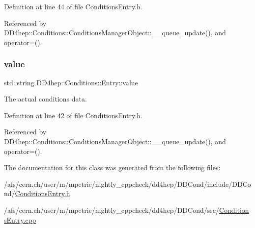 Definition at line 44 of file Conditions\+Entry.\+h.



Referenced by D\+D4hep\+::\+Conditions\+::\+Conditions\+Manager\+Object\+::\+\_\+\+\_\+queue\+\_\+update(), and operator=().

\hypertarget{class_d_d4hep_1_1_conditions_1_1_entry_a28dbb34f86ab05df22df9f9756100bcf}{}\label{class_d_d4hep_1_1_conditions_1_1_entry_a28dbb34f86ab05df22df9f9756100bcf} 
\subsubsection{\texorpdfstring{value}{value}}
{\footnotesize\ttfamily std\+::string D\+D4hep\+::\+Conditions\+::\+Entry\+::value}



The actual conditions data. 



Definition at line 42 of file Conditions\+Entry.\+h.



Referenced by D\+D4hep\+::\+Conditions\+::\+Conditions\+Manager\+Object\+::\+\_\+\+\_\+queue\+\_\+update(), and operator=().



The documentation for this class was generated from the following files\+:\begin{DoxyCompactItemize}
\item 
/afs/cern.\+ch/user/m/mpetric/nightly\+\_\+cppcheck/dd4hep/\+D\+D\+Cond/include/\+D\+D\+Cond/\hyperlink{_conditions_entry_8h}{Conditions\+Entry.\+h}\item 
/afs/cern.\+ch/user/m/mpetric/nightly\+\_\+cppcheck/dd4hep/\+D\+D\+Cond/src/\hyperlink{_conditions_entry_8cpp}{Conditions\+Entry.\+cpp}\end{DoxyCompactItemize}
